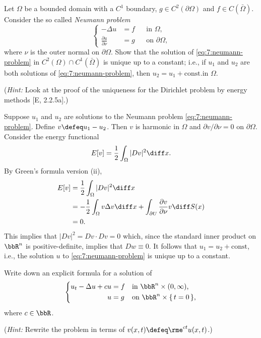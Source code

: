 \begin{problem}
  Let \(\Omega\) be a bounded domain with a \(C^1\) boundary, \(g\in
  C^2(\partial\Omega)\) and \(f\in C(\bar\Omega)\). Consider the so called
  \emph{Neumann problem}
  \[
    \label{eq:7:neumann-problem}%
    \tag{\(*\)}%
    \left\{
      \begin{aligned}
        -\Delta u&=f&&\text{in \(\Omega\),}\\
        \frac{\partial u}{\partial\nu}&=g&&\text{on \(\partial\Omega\),}
      \end{aligned}
    \right.
  \]
  where \(\nu\) is the outer normal on \(\partial\Omega\). Show that the
  solution of \eqref{eq:7:neumann-problem} in
  \(C^2(\Omega)\cap C^1(\bar\Omega)\) is unique up to a constant; i.e., if
  \(u_1\) and \(u_2\) are both solutions of \eqref{eq:7:neumann-problem},
  then \(u_2=u_1+\text{const.}\)\@ in \(\Omega\).

  \noindent (\emph{Hint:} Look at the proof of the uniqueness for the
  Dirichlet problem by energy methods [E, 2.2.5a].)
\end{problem}
\begin{solution}
  Suppose \(u_1\) and \(u_2\) are solutions to the Neumann problem
  \eqref{eq:7:neumann-problem}. Define \(v\defeq u_1-u_2\). Then \(v\) is
  harmonic in \(\Omega\) and \(\partial v/\partial \nu=0\) on
  \(\partial\Omega\). Consider the energy functional
  \[
    E[v]=\frac{1}{2}\int_\Omega|Dv|^2\diff x.
  \]
  By Green's formula version (ii),
  \begin{align*}
    E[v]
    &=\frac{1}{2}\int_\Omega|Dv|^2\diff x\\
    &=-\frac{1}{2}\int_\Omega v\Delta v\diff x
      +\int_{\partial U}\frac{\partial
      v}{\partial\nu} v\diff S(x)\\
    &=0.
  \end{align*}
  This implies that \(|Dv|^2=Dv\cdot Dv=0\) which, since the standard inner
  product on \(\bbR^n\) is positive-definite, implies that \(Dw\equiv
  0\). It follows that \(u_1=u_2+\text{const}\), i.e., the solution \(u\)
  to \eqref{eq:7:neumann-problem} is unique up to a constant.
\end{solution}
\newpage

\begin{problem}
  Write down an explicit formula for a solution of
  \[
    \left\{
      \begin{aligned}
        u_t-\Delta u+cu&=f&&\text{in \(\bbR^n\times(0,\infty)\),}\\
        u&=g&&\text{on \(\bbR^n\times\{\,t=0\,\}\),}
      \end{aligned}
    \right.
  \]
  where \(c\in\bbR\).

  \noindent (\emph{Hint:} Rewrite the problem in terms of
  \(v(x,t)\defeq\rme^{ct}u(x,t)\).)
\end{problem}
\begin{solution}
\end{solution}

